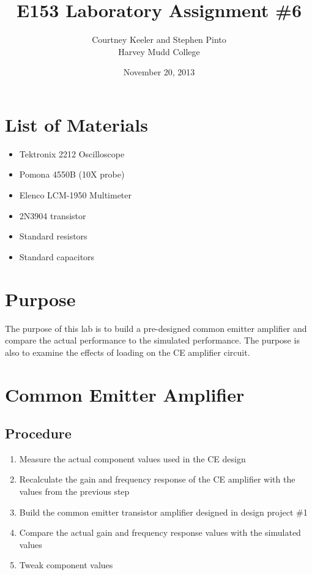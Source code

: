 \documentclass[12pt,letterpaper]{report}
\begin{document}
\title{E153 Laboratory Assignment \#6}
\author{Courtney Keeler and Stephen Pinto\\
Harvey Mudd College}
\date{November 20, 2013}
\maketitle

\section*{List of Materials}
\begin{itemize}
	\item Tektronix 2212 Oscilloscope
	\item Pomona 4550B (10X probe)
	\item Elenco LCM-1950 Multimeter
	\item 2N3904 transistor
	\item Standard resistors
	\item Standard capacitors
\end{itemize}

\section*{Purpose}
The purpose of this lab is to build a pre-designed common emitter amplifier and compare the actual performance to the simulated performance. The purpose is also to examine the effects of loading on the CE amplifier circuit.

\section*{Common Emitter Amplifier}
\subsection*{Procedure}

\begin{enumerate}
\item Measure the actual component values used in the CE design
\item Recalculate the gain and frequency response of the CE amplifier with the values from the previous step
\item Build the common emitter transistor amplifier designed in design project \#1
\item Compare the actual gain and frequency response values with the simulated values
\item Tweak component values 
\end{enumerate}
\end{document}

